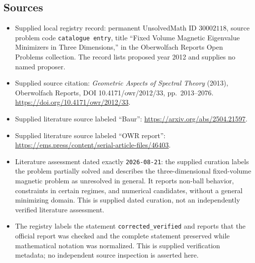 \documentclass[11pt]{article}
\begin{document}
\subsection{Sources}
\begin{itemize}
\item Supplied local registry record: permanent UnsolvedMath ID \(30002118\), source problem code \texttt{catalogue entry}, title ``Fixed Volume Magnetic Eigenvalue Minimizers in Three Dimensions,'' in the Oberwolfach Reports Open Problems collection. The record lists proposed year 2012 and supplies no named proposer.
\item Supplied source citation: \emph{Geometric Aspects of Spectral Theory} (2013), Oberwolfach Reports, DOI 10.4171/owr/2012/33, pp.~2013--2076. \url{https://doi.org/10.4171/owr/2012/33}.
\item Supplied literature source labeled ``Baur'': \url{https://arxiv.org/abs/2504.21597}.
\item Supplied literature source labeled ``OWR report'': \url{https://ems.press/content/serial-article-files/46403}.
\item Literature assessment dated exactly \texttt{2026-08-21}: the supplied curation labels the problem partially solved and describes the three-dimensional fixed-volume magnetic problem as unresolved in general. It reports non-ball behavior, constraints in certain regimes, and numerical candidates, without a general minimizing domain. This is supplied dated curation, not an independently verified literature assessment.
\item The registry labels the statement \texttt{corrected\_verified} and reports that the official report was checked and the complete statement preserved while mathematical notation was normalized. This is supplied verification metadata; no independent source inspection is asserted here.
\end{itemize}
\end{document}
